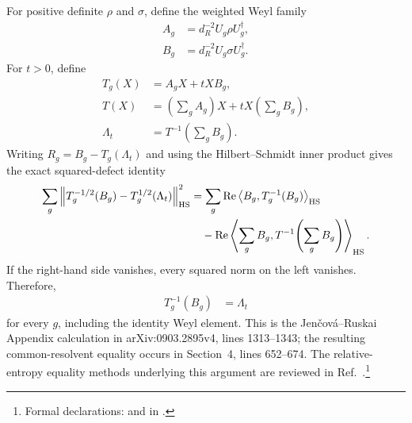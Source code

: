 \documentclass[11pt]{article}
\begin{document}
For positive definite $\rho$ and $\sigma$, define the weighted Weyl family
\begin{align}
    A_g
        &=d_R^{-2}U_g\rho U_g^\dagger,
    \label{eq:cpsv16_ssa_equality_hayashi_markov_weighted_weyl_state}\\
    B_g
        &=d_R^{-2}U_g\sigma U_g^\dagger.
    \label{eq:cpsv16_ssa_equality_hayashi_markov_weighted_weyl_reference}
\end{align}
For $t>0$, define
\begin{align}
    T_g(X)
        &=A_gX+tXB_g,
    \label{eq:cpsv16_ssa_equality_hayashi_markov_local_left_right_operator}\\
    T(X)
        &=\left(\sum_gA_g\right)X
          +tX\left(\sum_gB_g\right),
    \label{eq:cpsv16_ssa_equality_hayashi_markov_summed_left_right_operator}\\
    \Lambda_t
        &=T^{-1}\!\left(\sum_gB_g\right).
    \label{eq:cpsv16_ssa_equality_hayashi_markov_common_resolvent_candidate}
\end{align}
Writing $R_g=B_g-T_g(\Lambda_t)$ and using the Hilbert--Schmidt inner product
gives the exact squared-defect identity
\begin{align}
    \sum_g
    \left\|
        T_g^{-1/2}(B_g)-T_g^{1/2}(\Lambda_t)
    \right\|_{\mathrm{HS}}^2
        &=
        \sum_g\operatorname{Re}
        \left\langle B_g,T_g^{-1}(B_g)\right\rangle_{\mathrm{HS}}
        \notag\\
        &\quad-
        \operatorname{Re}
        \left\langle
            \sum_gB_g,
            T^{-1}\!\left(\sum_gB_g\right)
        \right\rangle_{\mathrm{HS}}.
    \label{eq:cpsv16_ssa_equality_hayashi_markov_resolvent_defect_identity}
\end{align}
If the right-hand side vanishes, every squared norm on the left vanishes.
Therefore,
\begin{align}
    T_g^{-1}(B_g)
        &=\Lambda_t
    \label{eq:cpsv16_ssa_equality_hayashi_markov_common_resolvent}
\end{align}
for every $g$, including the identity Weyl element. This is the
Jen\v{c}ov\'a--Ruskai Appendix calculation in arXiv:0903.2895v4,
lines 1313--1343; the resulting common-resolvent equality occurs in
Section~4, lines 652--674. The relative-entropy equality methods underlying
this argument are reviewed in Ref.~\cite{Cirac2021Matrix}.\footnote{Formal
declarations:
 and
 in
.}
\end{document}
